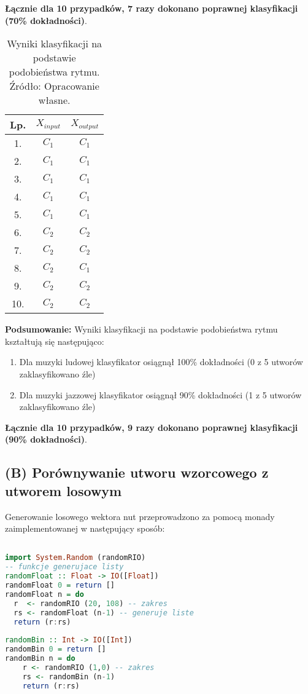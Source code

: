 \textbf{Łącznie dla 10 przypadków, 7 razy dokonano poprawnej klasyfikacji (70\% dokładności)}.
\FloatBarrier
\begin{table}[h]
\begin{tabular}{|c|c|c|}
\hline
Lp. & $X_{input}$ & $X_{output}$ \\ \hline
1.   & $C_{1}$      & $C_{1}$      \\ \hline
2.   & $C_{1}$      & $C_{1}$     \\ \hline
3.   & $C_{1}$      & $C_{1}$      \\ \hline
4.   & $C_{1}$      & $C_{1}$     \\ \hline
5.   & $C_{1}$      & $C_{1}$      \\ \hline
6.   & $C_{2}$      & $C_{2}$    \\ \hline
7.   & $C_{2}$      & $C_{2}$     \\ \hline
8.   & $C_{2}$      & $C_{1}$     \\ \hline
9.   & $C_{2}$      & $C_{2}$     \\ \hline
10.  & $C_{2}$      & $C_{2}$      \\ \hline
\end{tabular}
\centering
\caption{Wyniki klasyfikacji na podstawie podobieństwa rytmu. Źródło: Opracowanie własne.}
\end{table}
\FloatBarrier

\textbf{Podsumowanie:}
Wyniki klasyfikacji na podstawie podobieństwa rytmu kształtują się następująco:

\begin{enumerate}
    \item Dla muzyki ludowej klasyfikator osiągnął 100\% dokładności (0 z 5 utworów zaklasyfikowano źle)
    \item Dla muzyki jazzowej klasyfikator osiągnął 90\% dokładności (1 z 5 utworów zaklasyfikowano źle)
\end{enumerate}

\textbf{Łącznie dla 10 przypadków, 9 razy dokonano poprawnej klasyfikacji (90\% dokładności)}.





\subsection{(B) Porównywanie utworu wzorcowego z utworem losowym}

Generowanie losowego wektora nut przeprowadzono za pomocą monady zaimplementowanej w następujący sposób:
\begin{lstlisting}[language = Haskell]

import System.Random (randomRIO) 
-- funkcje generujace listy 
randomFloat :: Float -> IO([Float])
randomFloat 0 = return []
randomFloat n = do
  r  <- randomRIO (20, 108) -- zakres
  rs <- randomFloat (n-1) -- generuje liste
  return (r:rs)
  
randomBin :: Int -> IO([Int])
randomBin 0 = return []
randomBin n = do
    r <- randomRIO (1,0) -- zakres
    rs <- randomBin (n-1)
    return (r:rs)
\end{lstlisting}

